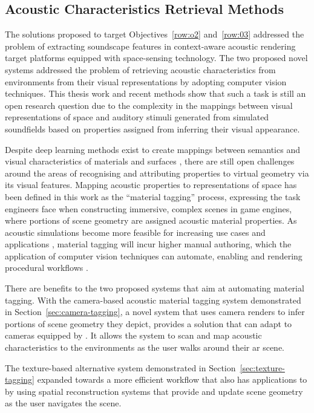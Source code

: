 \subsection{Acoustic Characteristics Retrieval Methods}
The solutions proposed to target Objectives~\ref{row:o2} and~\ref{row:03} addressed the problem of extracting soundscape features in context-aware acoustic rendering target platforms equipped with space-sensing technology. The two proposed novel systems addressed the problem of retrieving acoustic characteristics from environments from their visual representations by adopting computer vision techniques. This thesis work and recent methods show that such a task is still an open research question due to the complexity in the mappings between visual representations of space and auditory stimuli generated from simulated soundfields based on properties assigned from inferring their visual appearance.\par
Despite deep learning methods exist to create mappings between semantics and visual characteristics of materials and surfaces \citep{gaur2019superpixel,chen2022visual}, there are still open challenges around the areas of recognising and attributing properties to virtual geometry via its visual features.
Mapping acoustic properties to representations of space has been defined in this work as the ``material tagging'' process, expressing the task engineers face when constructing immersive, complex scenes in game engines, where portions of scene geometry are assigned acoustic material properties. As acoustic simulations become more feasible for increasing use cases and applications \citep{liu2020sound}, material tagging will incur higher manual authoring, which the application of computer vision techniques can automate, enabling and rendering procedural workflows \citep{schissler2017acoustic}.\par
There are benefits to the two proposed systems that aim at automating material tagging. With the camera-based acoustic material tagging system demonstrated in Section~\ref{sec:camera-tagging}, a novel system that uses camera renders to infer portions of scene geometry they depict, provides a solution that can adapt to cameras equipped by . It allows the system to scan and map acoustic characteristics to the environments as the user walks around their \acrshort{ar} scene.\par
The texture-based alternative system demonstrated in Section~\ref{sec:texture-tagging} expanded towards a more efficient workflow that also has applications to  by using spatial reconstruction systems that provide and update scene geometry as the user navigates the scene.

